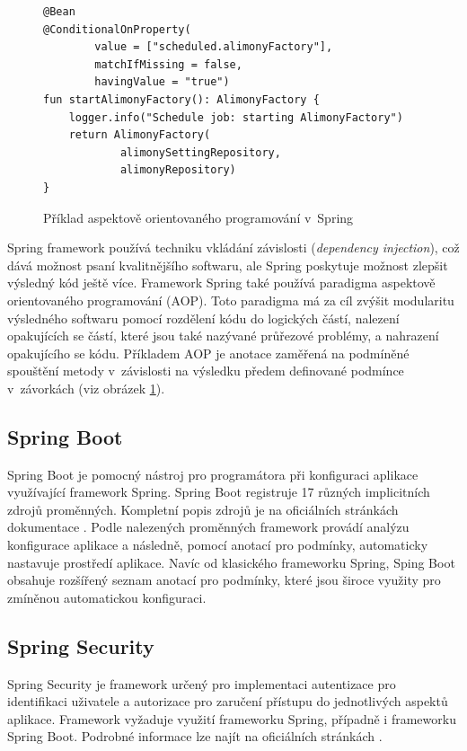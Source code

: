         
        \begin{figure}
            \begin{verbatim}
@Bean
@ConditionalOnProperty(
        value = ["scheduled.alimonyFactory"],
        matchIfMissing = false,
        havingValue = "true")
fun startAlimonyFactory(): AlimonyFactory {
    logger.info("Schedule job: starting AlimonyFactory")
    return AlimonyFactory(
            alimonySettingRepository,
            alimonyRepository)
}
            \end{verbatim}
            \caption{Příklad aspektově orientovaného programování v~Spring} 
            \label{code:spring-conditional}
        \end{figure}
        Spring framework používá techniku vkládání závislosti (\textit{dependency injection}), což dává možnost psaní kvalitnějšího softwaru, ale Spring poskytuje možnost zlepšit výsledný kód ještě více. Framework Spring také používá paradigma aspektově orientovaného programování (AOP). Toto paradigma má za cíl zvýšit modularitu výsledného softwaru pomocí rozdělení kódu do logických částí, nalezení opakujících se částí, které jsou také nazývané průřezové problémy, a nahrazení opakujícího se kódu. Příkladem AOP je anotace zaměřená na podmíněné spouštění metody v~závislosti na výsledku předem definované podmínce v~závorkách (viz obrázek \ref{code:spring-conditional}).
    
    \subsection{Spring Boot}
        Spring Boot je pomocný nástroj pro programátora při konfiguraci aplikace využívající framework Spring. Spring Boot registruje 17 různých implicitních zdrojů proměnných. Kompletní popis zdrojů je na oficiálních stránkách dokumentace \cite{spring-property-sources}. Podle nalezených proměnných framework provádí analýzu konfigurace aplikace a následně, pomocí anotací pro podmínky, automaticky nastavuje prostředí aplikace. Navíc od klasického frameworku Spring, Sping Boot obsahuje rozšířený seznam anotací pro podmínky, které jsou široce využity pro zmíněnou automatickou konfiguraci.\cite{spring-boot}
    
    \subsection{Spring Security}
        Spring Security je framework určený pro implementaci autentizace pro identifikaci uživatele a autorizace pro zaručení přístupu do jednotlivých aspektů aplikace. Framework vyžaduje využití frameworku Spring, případně i frameworku Spring Boot.   Podrobné informace lze najít na oficiálních stránkách \cite{spring-security}.
    
